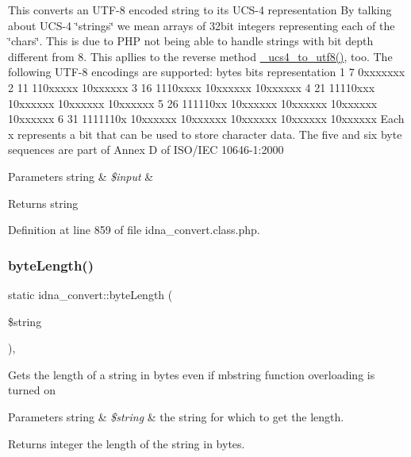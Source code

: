 This converts an U\+T\+F-\/8 encoded string to its U\+C\+S-\/4 representation By talking about U\+C\+S-\/4 \char`\"{}strings\char`\"{} we mean arrays of 32bit integers representing each of the \char`\"{}chars\char`\"{}. This is due to P\+HP not being able to handle strings with bit depth different from 8. This apllies to the reverse method \hyperlink{classidna__convert_a3827709d9c0e35a164838064f73daea5}{\+\_\+ucs4\+\_\+to\+\_\+utf8()}, too. The following U\+T\+F-\/8 encodings are supported\+: bytes bits representation 1 7 0xxxxxxx 2 11 110xxxxx 10xxxxxx 3 16 1110xxxx 10xxxxxx 10xxxxxx 4 21 11110xxx 10xxxxxx 10xxxxxx 10xxxxxx 5 26 111110xx 10xxxxxx 10xxxxxx 10xxxxxx 10xxxxxx 6 31 1111110x 10xxxxxx 10xxxxxx 10xxxxxx 10xxxxxx 10xxxxxx Each x represents a bit that can be used to store character data. The five and six byte sequences are part of Annex D of I\+S\+O/\+I\+EC 10646-\/1\+:2000 
\begin{DoxyParams}[1]{Parameters}
string & {\em \$input} & \\
\hline
\end{DoxyParams}
\begin{DoxyReturn}{Returns}
string 
\end{DoxyReturn}


Definition at line 859 of file idna\+\_\+convert.\+class.\+php.

\mbox{\label{classidna__convert_a964eafd23cc4069f6aa9912bcdfb61c7}} 
\subsubsection{\texorpdfstring{byte\+Length()}{byteLength()}}
{\footnotesize\ttfamily static idna\+\_\+convert\+::byte\+Length (\begin{DoxyParamCaption}\item[{}]{\$string }\end{DoxyParamCaption})\hspace{0.3cm}{\ttfamily [static]}, {\ttfamily [protected]}}

Gets the length of a string in bytes even if mbstring function overloading is turned on


\begin{DoxyParams}[1]{Parameters}
string & {\em \$string} & the string for which to get the length. \\
\hline
\end{DoxyParams}
\begin{DoxyReturn}{Returns}
integer the length of the string in bytes. 
\end{DoxyReturn}


